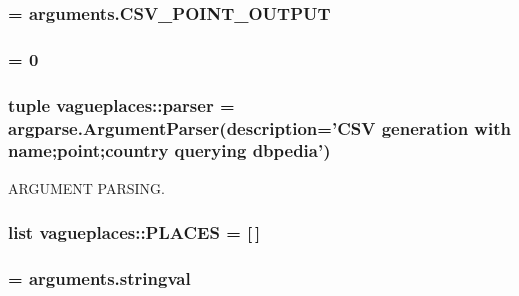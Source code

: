 \hypertarget{namespacevagueplaces_a206384d666558c145679f9ecdb3dd7c5}{
\subsubsection[{\-O\-F}]{ = arguments.\-C\-S\-V\-\_\-\-P\-O\-I\-N\-T\-\_\-\-O\-U\-T\-P\-U\-T}}\label{namespacevagueplaces_a206384d666558c145679f9ecdb3dd7c5}
\hypertarget{namespacevagueplaces_aedee1b25605e448202ade844e392b896}{
\subsubsection[{offset}]{ = 0}}\label{namespacevagueplaces_aedee1b25605e448202ade844e392b896}
\hypertarget{namespacevagueplaces_a12260e069d767b0750c1e8f31af9cefb}{
\subsubsection[{parser}]{\setlength{\rightskip}{0pt plus 5cm}tuple {\bf vagueplaces\-::parser} = argparse.\-Argument\-Parser(description='\-C\-S\-V generation with name;point;{\bf country} querying dbpedia')}}\label{namespacevagueplaces_a12260e069d767b0750c1e8f31af9cefb}


\-A\-R\-G\-U\-M\-E\-N\-T \-P\-A\-R\-S\-I\-N\-G. 

\hypertarget{namespacevagueplaces_a611b348baa6cc63b93677dea3e188397}{
\subsubsection[{\-P\-L\-A\-C\-E\-S}]{\setlength{\rightskip}{0pt plus 5cm}list {\bf vagueplaces\-::\-P\-L\-A\-C\-E\-S} = \mbox{[}$\,$\mbox{]}}}\label{namespacevagueplaces_a611b348baa6cc63b93677dea3e188397}
\hypertarget{namespacevagueplaces_afc402b26135ad61137fcb1208053cbf8}{
\subsubsection[{query}]{ = arguments.\-stringval}}\label{namespacevagueplaces_afc402b26135ad61137fcb1208053cbf8}


